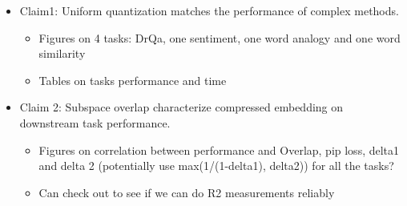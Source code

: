 \begin{itemize}
\item Claim1: Uniform quantization matches the performance of complex methods. 
	\begin{itemize}
		\item Figures on 4 tasks: DrQa, one sentiment, one word analogy and one word similarity
		\item Tables on tasks performance and time
	\end{itemize}
\item Claim 2: Subspace overlap characterize compressed embedding on downstream task performance. 
	\begin{itemize}
		\item Figures on correlation between performance and Overlap, pip loss, delta1 and delta 2 (potentially use max(1/(1-delta1), delta2)) for all the tasks?
		\item Can check out to see if we can do R2 measurements reliably
	\end{itemize}
\end{itemize}


